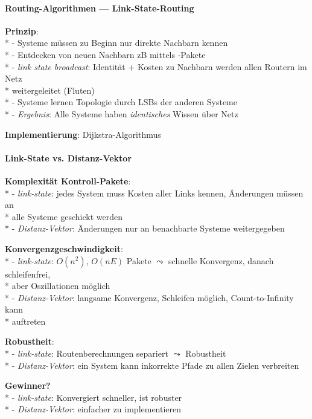 \paragraph{Routing-Algorithmen --- Link-State-Routing}
\begin{items}
  \item \textbf{Prinzip}: \\*
    - Systeme müssen zu Beginn nur direkte Nachbarn kennen \\*
    - Entdecken von neuen Nachbarn zB mittels -Pakete \\*
    - \emph{link state broadcast}: Identität + Kosten zu Nachbarn werden allen Routern im Netz \\* \phantom{-} \phantom{\( \cdot \)} weitergeleitet (Fluten) \\*
    - Systeme lernen Topologie durch LSBs der anderen Systeme \\*
    - \emph{Ergebnis}: Alle Systeme haben \emph{identisches} Wissen über Netz
  \item \textbf{Implementierung}: Dijkstra-Algorithmus
\end{items}

\paragraph{Link-State vs. Distanz-Vektor}
\begin{items}
  \item \textbf{Komplexität Kontroll-Pakete}: \\*
    - \emph{link-state}: jedes System muss Kosten aller Links kennen, Änderungen müssen an \\* \phantom{-} \phantom{\( \cdot \)} alle Systeme geschickt werden \\*
    - \emph{Distanz-Vektor}: Änderungen nur an benachbarte Systeme weitergegeben
  \item \textbf{Konvergenzgeschwindigkeit}: \\*
    - \emph{link-state}: \( O(n^2) \), \( O(nE) \) Pakete \( \leadsto \) schnelle Konvergenz, danach schleifenfrei, \\* \phantom{-} \phantom{\( \cdot \)} aber Oszillationen möglich \\*
    - \emph{Distanz-Vektor}: langsame Konvergenz, Schleifen möglich, Count-to-Infinity kann \\* \phantom{-} \phantom{\( \cdot \)} auftreten
  \item \textbf{Robustheit}: \\*
    - \emph{link-state}: Routenberechnungen separiert \( \leadsto \) Robustheit \\*
    - \emph{Distanz-Vektor}: ein System kann inkorrekte Pfade zu allen Zielen verbreiten
  \item \textbf{Gewinner?} \\*
    - \emph{link-state}: Konvergiert schneller, ist robuster \\*
    - \emph{Distanz-Vektor}: einfacher zu implementieren
\end{items}

